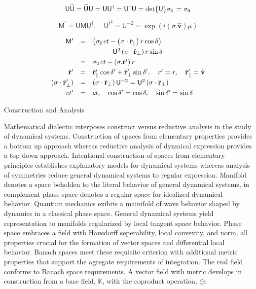 \documentclass[aps,twocolumn,secnumarabic,nobalancelastpage,amsmath,amssymb,
amsthm,nofootinbib,parskip=full]{revtex4}
\numberwithin{equation}{section}
\newcommand{\adjoint}[1]{\widetilde{#1}}
\newcommand{\uvector}[1]{\hat{\mathbf{#1}}}
\newcommand{\pauli}[1]{\sigma_#1\mkern2mu}
\newcommand{\qv}[1]{\mathbf{\mathsf{#1}}}
\begin{document}
\begin{equation*}
\qv{U}\adjoint{\qv{U}}=
\adjoint{\qv{U}}\qv{U}=
\qv{U}\qv{U}^\dagger=\qv{U}^\dagger\qv{U}=
\det{\qv{U}}\pauli{0}=\pauli{0}
\end{equation*}

\begin{equation*}
\qv{M}^\prime=\qv{U}\qv{M}\qv{U}^\dagger,
\quad\qv{U}^\dagger^2=\qv{U}^{-2}=
\exp\left(i\left(\sigma.\uvector{v}\right)\mu\right)
\end{equation*}

\begin{equation*}
\begin{array}{rcl}
\qv{M}^\prime&=&
\left(\pauli{0}ct-
\left(\sigma\cdot\uvector{r}_\parallel\right)r\cos\delta\right) \\[3pt]
&&\qquad-\,\qv{U}^2
   \left(\sigma\cdot\uvector{r}_\perp\right)r\sin\delta \\[3pt]
&=&\pauli{0}ct-\left(\sigma.\uvector{r}^\prime\right)r \\[3pt]
\uvector{r}^\prime&=&
    \uvector{r}^\prime_\parallel\cos\delta^\prime+
    \uvector{r}^\prime_\perp\sin\delta^\prime,\quad r^\prime=r,
    \quad\uvector{r}^\prime_\parallel=\uvector{v} \\[3pt]
\left(\sigma\cdot\uvector{r}^\prime_\perp\right)&=&
               \left(\sigma\cdot\uvector{r}_\perp\right)\qv{U}^{-2}=
               \qv{U}^2\left(\sigma\cdot\uvector{r}_\perp\right) \\[3pt]
ct^\prime&=&ct,\quad\cos\delta^\prime=\cos\delta,\quad
                                       \sin\delta^\prime=\sin\delta
\end{array}
\end{equation*}

Construction and Analysis

Mathematical dialectic interposes construct versus reductive analysis
in the study of dynamical systems.
Construction of spaces from elementary properties
provides a bottom up approach whereas reductive analysis
of dynmical expression provides a top down approach.
Intentional construction of spaces from elementary principles
establishes explanatory models for dynamical systems
whereas analysis of symmetries reduce general dynamical
systems to regular expression.
Manifold denotes a space beholden to the literal behavior
of general dynamical systems, in complement phase space
denotes a regular space for idealized dynamical behavior.
Quantum mechanics exibits a mainifold of wave behavior
shaped by dynamics in a classical phase space.
General dynamical systems yield representation to
manifolds regularized by local tangent space behavior.
Phase space embraces a field
with Hausdorff seperability, local convexity,
and norm, all properties crucial for the
formation of vector spaces and differential local behavior.
Banach spaces meet these requisite criterion with additional
metric properties that support the agregate requirements of integration.
The real field conforms to Banach space requirements.
A vector field with metric develops in
construction from a base field, $\mathbb{K}$,
with  the coproduct operation, $\oplus$:
\end{document}
